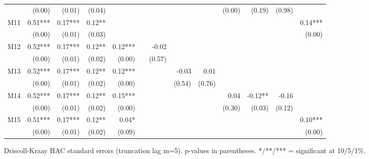 \begin{table}[htbp]
{\begin{tabular}{lrrrrrrrrrrrr}
 & (0.00) & (0.01) & (0.04) &  &  &  &  &  & (0.00) & (0.19) & (0.98) &  \\
M11 & 0.51*** & 0.17*** & 0.12** &  &  &  &  &  &  &  &  & 0.14*** \\
 & (0.00) & (0.01) & (0.03) &  &  &  &  &  &  &  &  & (0.00) \\
M12 & 0.52*** & 0.17*** & 0.12** & 0.12*** &  & -0.02 &  &  &  &  &  &  \\
 & (0.00) & (0.01) & (0.02) & (0.00) &  & (0.57) &  &  &  &  &  &  \\
M13 & 0.52*** & 0.17*** & 0.12** & 0.12*** &  &  & -0.03 & 0.01 &  &  &  &  \\
 & (0.00) & (0.01) & (0.02) & (0.00) &  &  & (0.54) & (0.76) &  &  &  &  \\
M14 & 0.52*** & 0.17*** & 0.12** & 0.15*** &  &  &  &  & 0.04 & -0.12** & -0.16 &  \\
 & (0.00) & (0.01) & (0.02) & (0.00) &  &  &  &  & (0.30) & (0.03) & (0.12) &  \\
M15 & 0.51*** & 0.17*** & 0.12** & 0.04* &  &  &  &  &  &  &  & 0.10*** \\
 & (0.00) & (0.01) & (0.02) & (0.09) &  &  &  &  &  &  &  & (0.00) \\
\bottomrule
\end{tabular}%
}
\smallskip
\small
\noindent Driscoll-Kraay HAC standard errors (truncation lag m=5). p-values in parentheses. */**/*** = significant at 10/5/1\%.
\end{table}